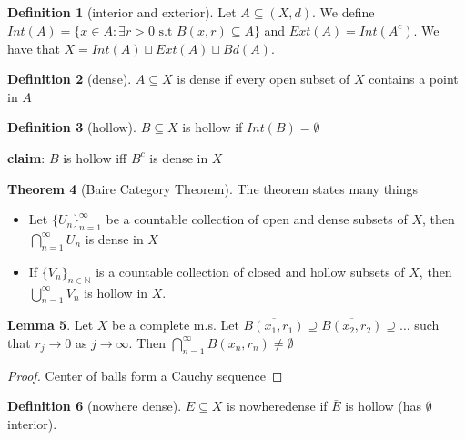 \documentclass[13pt]{article}
\theoremstyle{definition} --- default
\newtheorem{theorem}{Theorem}
\newtheorem{lemma}[theorem]{Lemma}
\theoremstyle{definition}
\newtheorem{definition}[theorem]{Definition}
\theoremstyle{remark}
\begin{document}
	\begin{definition}[interior and exterior]
		Let $A \subseteq (X,d)$. We define $Int(A) = \{x \in A\colon \exists r > 0 \text{ s.t } B(x,r) \subseteq A\}$ and $Ext(A) = Int(A^c)$. We have that $X = Int(A) \sqcup Ext(A) \sqcup Bd(A)$.


	\end{definition}
	\begin{definition}[dense]
		$A \subseteq X$ is dense if every open subset of $X$ contains a point in $A$	
	\end{definition}

	\begin{definition}[hollow]
		$B \subseteq X$ is hollow if $Int(B) = \emptyset$	
	\end{definition}
	\textbf{claim}: $B$ is hollow iff $B^c$ is dense in $X$
	\begin{theorem}[Baire Category Theorem]
		The theorem states many things
		\begin{itemize}
			\item Let $\{U_n\}_{n =1}^\infty $ be a countable collection of open and dense subsets of $X$, then $\bigcap_{n=1}^\infty U_n$ is dense in $X$
			\item If $\{V_n\}_{n \in \mathbb{N}}$ is a countable collection of closed and hollow  subsets of $X$, then $\bigcup_{n=1}^\infty V_n$ is hollow in $X$.
		\end{itemize}	
	\end{theorem}

	\begin{lemma}
		Let $X$ be a complete m.s. Let $\overline{B(x_1,r_1)} \supseteq \overline{B(x_2,r_2)} \supseteq \ldots$ such that $r_j \to 0$ as $j \to \infty$. Then $\bigcap_{n=1}^\infty B(x_n, r_n) \neq \emptyset$
	\end{lemma}
	\begin{proof}
		Center of balls form a Cauchy sequence
	\end{proof}
	\begin{definition}[nowhere dense]
		$E \subseteq X$ is nowheredense if $\bar{E}$ is hollow (has $\emptyset$ interior).
	\end{definition}
\end{document}
